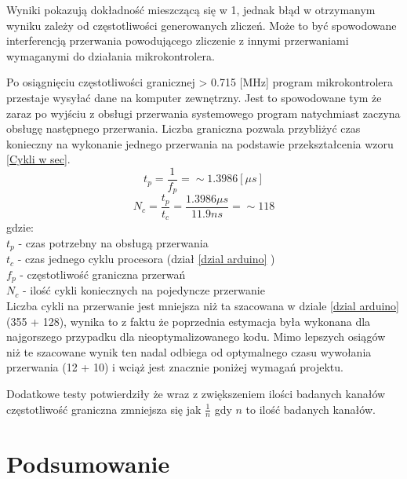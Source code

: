 \documentclass[a4paper,12pt]{article}
\begin{document}
Wyniki pokazują dokładność mieszczącą się w  1\textperthousand, 
jednak błąd w otrzymanym wyniku zależy od częstotliwości generowanych zliczeń.
Może to być spowodowane interferencją przerwania powodującego zliczenie z innymi przerwaniami wymaganymi do działania mikrokontrolera.

Po osiągnięciu częstotliwości granicznej > 0.715 [MHz] program mikrokontrolera przestaje wysyłać dane na komputer zewnętrzny.
Jest to spowodowane tym że zaraz po wyjściu z obsługi przerwania systemowego program natychmiast zaczyna obsługę następnego przerwania. 
Liczba graniczna pozwala przybliżyć czas konieczny na wykonanie jednego przerwania na podstawie przekształcenia wzoru \ref{Cykli w sec}. 
$$ t_p = \frac{1}{f_p} = \sim 1.3986 [\mu s] $$
$$ N_c = \frac{t_p}{t_c} =  \frac{1.3986 \mu s}{11.9 ns} =\sim 118$$
gdzie: \\
        \indent $t_p$ -  czas potrzebny na obsługą przerwania\\
        \indent $t_c$ -  czas jednego cyklu procesora (dział \ref{dzial arduino} ) \\
        \indent $f_p$ -  częstotliwość graniczna przerwań \\
        \indent $N_c$ -  ilość cykli koniecznych na pojedyncze przerwanie \\

Liczba cykli na przerwanie jest mniejsza niż ta szacowana w dziale \ref{dzial arduino} (355 + 128)\cite{ard_opt_git}, wynika to z faktu że poprzednia estymacja była wykonana dla najgorszego przypadku dla nieoptymalizowanego kodu.
Mimo lepszych osiągów niż te szacowane wynik ten nadal odbiega od optymalnego czasu wywołania przerwania (12 + 10) \cite{interupt latency} i wciąż jest znacznie poniżej wymagań projektu. 

Dodatkowe testy potwierdziły że wraz z zwiększeniem ilości badanych kanałów częstotliwość graniczna zmniejsza się jak $\frac{1}{n}$ gdy $n$ to ilość badanych kanałów. 


\newpage
\section{Podsumowanie}
\end{document}
